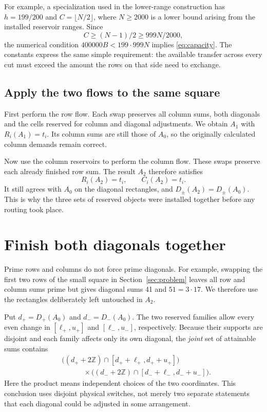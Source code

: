\documentclass[11pt]{article}
\theoremstyle{definition}
\begin{document}
For example, a specialization used in the lower-range construction has
\(h=199/200\) and \(C=\lfloor N/2\rfloor\), where \(N\ge2000\) is a
lower bound arising from the installed reservoir ranges. Since
\[
 C\ge (N-1)/2\ge 999N/2000,
\]
the numerical condition \(400000B<199\cdot999N\) implies \eqref{eq:capacity}.
The constants express the same simple requirement: the available transfer
across every cut must exceed the amount the rows on that side need to exchange.

\subsection{Apply the two flows to the same square}

First perform the row flow. Each swap preserves all column sums, both
diagonals and the cells reserved for column and diagonal adjustments. We
obtain \(A_1\) with \(R_i(A_1)=t_i\). Its column sums are still those of
\(A_0\), so the originally calculated column demands remain correct.

Now use the column reservoirs to perform the column flow. These swaps
preserve each already finished row sum. The result \(A_2\) therefore satisfies
\[
 R_i(A_2)=t_i,\qquad C_i(A_2)=t_i.
\]
It still agrees with \(A_0\) on the diagonal rectangles, and
\(D_\pm(A_2)=D_\pm(A_0)\). This is why the three sets of reserved objects
were installed together before any routing took place.

\section{Finish both diagonals together}\label{sec:diagonals}

Prime rows and columns do not force prime diagonals. For example, swapping
the first two rows of the small square in Section~\ref{sec:problem} leaves all
row and column sums prime but gives diagonal sums 41 and \(51=3\cdot17\).
We therefore use the rectangles deliberately left untouched in \(A_2\).

Put \(d_+=D_+(A_0)\) and \(d_-=D_-(A_0)\). The two reserved families allow
every even change in \([\ell_+,u_+]\) and \([\ell_-,u_-]\), respectively.
Because their supports are disjoint and each family affects only its own
diagonal, the \emph{joint} set of attainable sums contains
\begin{equation}\label{eq:joint}
 \begin{split}
 &\bigl((d_++2\mathbb Z)\cap[d_++\ell_+,d_++u_+]\bigr)\\
 &\hspace{3em}\times
 \bigl((d_-+2\mathbb Z)\cap[d_-+\ell_-,d_-+u_-]\bigr).
 \end{split}
\end{equation}
Here the product means independent choices of the two coordinates. This
conclusion uses disjoint physical switches, not merely two separate statements
that each diagonal could be adjusted in some arrangement.
\end{document}
